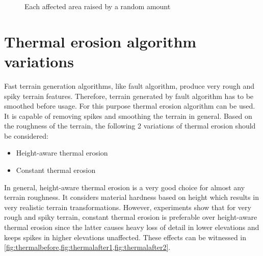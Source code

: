\documentclass[11pt,a4paper,twoside,openright]{report}
\begin{document}
\begin{figure}[!htb]
  \caption{Each affected area raised by a random amount}\label{fig:mountainrangealteration}
\endminipage
\end{figure}

\section{Thermal erosion algorithm variations}
Fast terrain generation algorithms, like fault algorithm, produce very rough and spiky terrain features. Therefore, terrain generated by fault algorithm has to be smoothed before usage. For this purpose thermal erosion algorithm can be used. It is capable of removing spikes and smoothing the terrain in general. Based on the roughness of the terrain, the following 2 variations of thermal erosion should be considered:
\begin{itemize}
  \item Height-aware thermal erosion
  \item Constant thermal erosion
\end{itemize}
In general, height-aware thermal erosion is a very good choice for almost any terrain roughness. It considers material hardness based on height which results in very realistic terrain transformations. However, experiments show that for very rough and spiky terrain, constant thermal erosion is preferable over height-aware thermal erosion since the latter causes heavy loss of detail in lower elevations and keeps spikes in higher elevations unaffected. These effects can be witnessed in \cref{fig:thermalbefore,fig:thermalafter1,fig:thermalafter2}.
\end{document}
